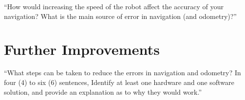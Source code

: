 \documentclass[twocolumn]{article}
\begin{document}
``How would increasing the speed of the robot affect the accuracy of your navigation? What is the main source of error in navigation (and odometry)?''

\section{Further Improvements}

``What steps can be taken to reduce the errors in navigation and odometry? In four (4) to six (6) sentences, Identify at least one hardware and one software solution, and provide an explanation as to why they would work.''


\end{document}
